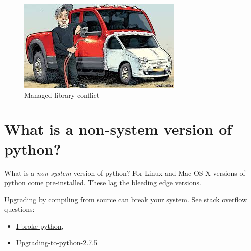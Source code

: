\documentclass[bigger]{beamer}
\begin{document}
\begin{frame}[label=sec-2-3]{}
\begin{figure}[htb]
\centering
\includegraphics[width=.9\linewidth]{./images/TwoCars.jpeg}
\caption{Managed library conflict}
\end{figure}
\end{frame}

\section{What is a non-system version of python?}
\label{sec-3}

\begin{frame}[label=sec-3-1]{What is a \emph{non-system} version of python?}
For Linux and Mac OS X versions of python come pre-installed.  These 
lag the bleeding edge versions. 
\begin{exampleblock}{Upgrading by compiling from source can break your system. See stack overflow questions:} 
\begin{itemize}
\item \href{http://stackoverflow.com/questions/18834381/i-broke-python-what-can-i-do}{I-broke-python},
\item \href{http://askubuntu.com/questions/333109/upgrading-to-python-2-7-5-on-ubuntu-12-04}{Upgrading-to-python-2.7.5}
\end{itemize}
\end{exampleblock}
\end{frame}
\end{document}
